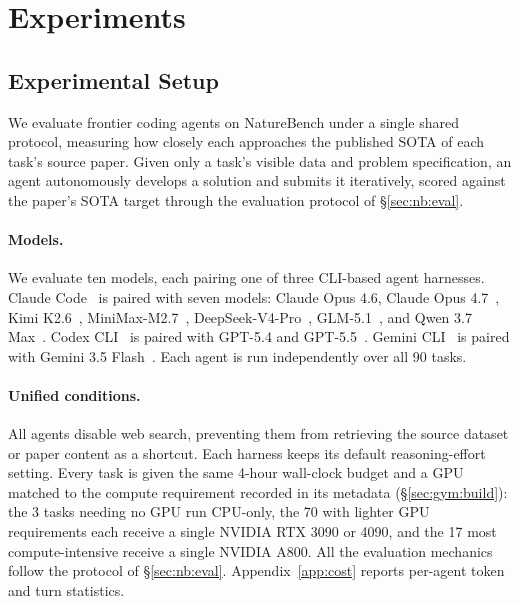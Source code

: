 \documentclass{llmxive}
\begin{document}
 
 
 
 
 
 
 
 
 
 
 
 
 


\section{Experiments}
\label{sec:exp}

\subsection{Experimental Setup}
\label{sec:exp:setup}

We evaluate frontier coding agents on NatureBench under a single shared protocol, measuring how closely each approaches the published SOTA of each task's source paper. Given only a task's visible data and problem specification, an agent autonomously develops a solution and submits it iteratively, scored against the paper's SOTA target through the evaluation protocol of \S\ref{sec:nb:eval}.

\paragraph{Models.}
We evaluate ten models, each pairing one of three CLI-based agent harnesses. Claude Code~\citep{anthropic2025claudecode} is paired with seven models: Claude Opus 4.6, Claude Opus 4.7~\citep{anthropic2026opus46,anthropic2026opus47}, Kimi K2.6~\citep{moonshot2026kimik2}, MiniMax-M2.7~\citep{minimax2026m27}, DeepSeek-V4-Pro~\citep{deepseek2026v4}, GLM-5.1~\citep{zai2026glm51}, and Qwen 3.7 Max~\citep{qwen2026max}. Codex CLI~\citep{openai2025codex} is paired with GPT-5.4 and GPT-5.5~\citep{openai2026gpt54,openai2026gpt55}. Gemini CLI~\citep{google2025geminicli} is paired with Gemini 3.5 Flash~\citep{google2026gemini35flash}. Each agent is run independently over all 90 tasks.

\paragraph{Unified conditions.}
All agents disable web search, preventing them from retrieving the source dataset or paper content as a shortcut. Each harness keeps its default reasoning-effort setting. Every task is given the same 4-hour wall-clock budget and a GPU matched to the compute requirement recorded in its metadata (\S\ref{sec:gym:build}): the 3 tasks needing no GPU run CPU-only, the 70 with lighter GPU requirements each receive a single NVIDIA RTX 3090 or 4090, and the 17 most compute-intensive receive a single NVIDIA A800. All the evaluation mechanics follow the protocol of \S\ref{sec:nb:eval}. Appendix~\ref{app:cost} reports per-agent token and turn statistics.
\end{document}
